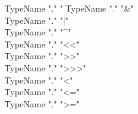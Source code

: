 {\begin{grammar}
    \| TypeName \xcd"." \xcd"%
    \| TypeName \xcd"." \xcd"&"\\
    \| TypeName \xcd"." \xcd"|"\\
    \| TypeName \xcd"." \xcd"^"\\
    \| TypeName \xcd"." \xcd"<<"\\
    \| TypeName \xcd"." \xcd">>"\\
    \| TypeName \xcd"." \xcd">>>"\\
    \| TypeName \xcd"." \xcd"<"\\
    \| TypeName \xcd"." \xcd"<="\\
    \| TypeName \xcd"." \xcd">="\\
\end{grammar}

\begin{grammar}


\end{grammar}}
